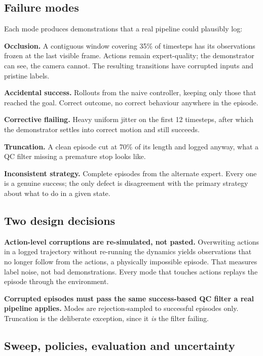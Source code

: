 \documentclass[10pt,twocolumn]{article}
\begin{document}
\subsection{Failure modes}

Each mode produces demonstrations that a real pipeline could plausibly log:

\textbf{Occlusion.} A contiguous window covering 35\% of timesteps has its
observations frozen at the last visible frame. Actions remain
expert-quality; the demonstrator can see, the camera cannot. The resulting
transitions have corrupted inputs and pristine labels.

\textbf{Accidental success.} Rollouts from the naive controller, keeping only
those that reached the goal. Correct outcome, no correct behaviour anywhere in
the episode.

\textbf{Corrective flailing.} Heavy uniform jitter on the first 12 timesteps,
after which the demonstrator settles into correct motion and still succeeds.

\textbf{Truncation.} A clean episode cut at 70\% of its length and logged
anyway, what a QC filter missing a premature stop looks like.

\textbf{Inconsistent strategy.} Complete episodes from the alternate expert.
Every one is a genuine success; the only defect is disagreement with the
primary strategy about what to do in a given state.

\subsection{Two design decisions}

\textbf{Action-level corruptions are re-simulated, not pasted.} Overwriting
actions in a logged trajectory without re-running the dynamics yields
observations that no longer follow from the actions, a physically impossible
episode. That measures label noise, not bad demonstrations. Every mode that
touches actions replays the episode through the environment.

\textbf{Corrupted episodes must pass the same success-based QC filter a real
pipeline applies.} Modes are rejection-sampled to successful episodes only.
Truncation is the deliberate exception, since it \emph{is} the filter failing.

\subsection{Sweep, policies, evaluation and uncertainty}
\end{document}
